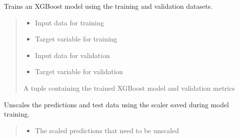 \documentclass[letterpaper,10pt,english]{sphinxmanual}
\begin{document}
\begin{fulllineitems}
\begin{fulllineitems}
\label{\detokenize{docs/XGB_model:XGB_model.XGB_Predictor.train_model}}
\pysigstartsignatures
{}
\pysigstopsignatures
\sphinxAtStartPar
Trains an XGBoost model using the training and validation datasets.
\begin{quote}\begin{description}
\begin{itemize}
\item {} 
\sphinxAtStartPar
{} \textendash{} Input data for training

\item {} 
\sphinxAtStartPar
{} \textendash{} Target variable for training

\item {} 
\sphinxAtStartPar
{} \textendash{} Input data for validation

\item {} 
\sphinxAtStartPar
{} \textendash{} Target variable for validation

\end{itemize}

\sphinxAtStartPar
A tuple containing the trained XGBoost model and validation metrics

\end{description}\end{quote}

\end{fulllineitems}


\begin{fulllineitems}
\label{\detokenize{docs/XGB_model:XGB_model.XGB_Predictor.unscale_data}}
\pysigstartsignatures
{}
\pysigstopsignatures
\sphinxAtStartPar
Unscales the predictions and test data using the scaler saved during model training.
\begin{quote}\begin{description}
\begin{itemize}
\item {} 
\sphinxAtStartPar
{} \textendash{} The scaled predictions that need to be unscaled


\end{itemize}
\end{description}
\end{quote}
\end{fulllineitems}
\end{fulllineitems}
\end{document}
